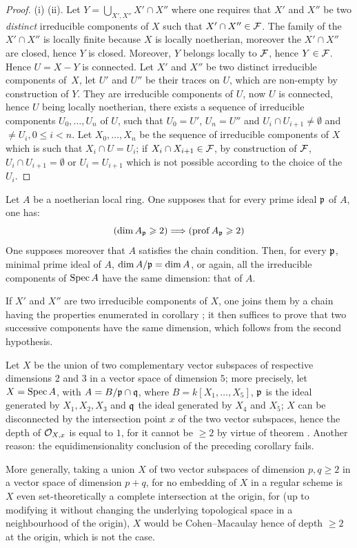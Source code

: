 \begin{proof}
(i) \ALORS (ii). Let $Y=\bigcup_{X', X''} X'\cap X''$ where one requires that $X'$ and $X''$ be two \emph{distinct} irreducible components of $X$ such that $X'\cap X'' \in {\mathcal F}$. The family of the $X'\cap X''$ is locally finite because $X$ is locally noetherian, moreover the $X'\cap X''$ are closed, hence $Y$ is closed. Moreover, $Y$ belongs locally to ${\mathcal F}$, hence $Y\in {\mathcal F}$. Hence $U=X-Y$ is connected. Let $X'$ and $X''$ be two distinct irreducible components of~$X$, let $U'$ and $U''$ be their traces on $U$, which are non-empty by construction of $Y$. They are irreducible components of $U$, now $U$ is connected, hence $U$ being locally noetherian, there exists a sequence of irreducible components $U_0, \ldots, U_n$ of $U$, such that $U_0=U'$, $U_n=U''$ and $U_{i}\cap U_{i+1}\neq \emptyset$ and $\neq U_{i}, 0\leq i < n$. Let $X_0, \ldots, X_n$ be the sequence of irreducible components of $X$ which is such that $X_{i}\cap U=U_{i}$; if $X_{i}\cap X_{i+1}\in {\mathcal F}$, by construction of ${\mathcal F}$, $U_{i}\cap U_{i+1}=\emptyset$ or $U_{i}=U_{i+1}$ which is not possible according to the choice of the $U_{i}$.
\end{proof}

\begin{corollary} \label{III.3.9}
Let $A$ be a noetherian local ring. One supposes that for every prime ideal $\mathfrak{p}$ of $A$, one has:
\[
(\dim A_\pp \geq 2) \To (\prof A_\pp \geq 2)
\]
One supposes moreover that $A$ satisfies the chain condition. Then, for every $\mathfrak{p}$, minimal prime ideal of $A$, $\dim A/\mathfrak{p} =\dim A$, or again, all the irreducible components of $\operatorname{Spec} A$ have the same dimension: that of $A$.
\end{corollary}

If $X'$ and $X''$ are two irreducible components of $X$, one joins them by a chain having the properties enumerated in corollary ; it then suffices to prove that two successive components have the same dimension, which follows from the second hypothesis.

\begin{example} \label{III.3.10}
Let $X$ be the union of two complementary vector subspaces of respective dimensions $2$ and $3$ in a vector space of dimension $5$; more precisely, let $X=\operatorname{Spec} A$, with $A=B/{\mathfrak{p} \cap \mathfrak{q}}$, where $B=k[X_1, \ldots, X_5]$, $\mathfrak{p}$ is the ideal generated by $X_1, X_2, X_3$ and $\mathfrak{q}$ the ideal generated by $X_4$ and $X_5$; $X$ can be disconnected by the intersection point $x$ of the two vector subspaces, hence the depth of ${\mathcal O}_{X, x}$ is equal to $1$, for it cannot be $\geq 2$ by virtue of theorem . Another reason: the equidimensionality conclusion of the preceding corollary fails.

More generally, taking a union $X$ of two vector subspaces of dimension $p, q\geq 2$ in a vector space of dimension $p+q$, for no embedding of $X$ in a regular scheme is $X$ even set-theoretically a complete intersection at the origin, for (up to modifying it without changing the underlying topological space in a neighbourhood of the origin), $X$ would be Cohen--Macaulay hence of depth $\geq 2$ at the origin, which is not the case.
\end{example}

